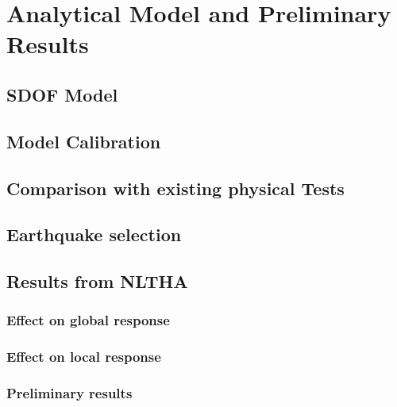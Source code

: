 \chapter{Analytical Model and Preliminary Results}

\section{SDOF Model}
\lipsum[1]
\section{Model Calibration}
\lipsum[2]
\section{Comparison with existing physical Tests}
\lipsum[3]
\section{Earthquake selection}
\lipsum[4]
\section{Results from NLTHA}
\lipsum[5]
\subsection{Effect on global response}
\lipsum[6]
\subsection{Effect on local response}
\lipsum[7]
\subsection{Preliminary results}
\lipsum[8]